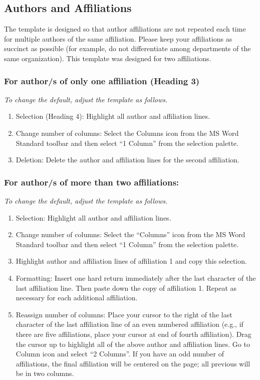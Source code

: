 \documentclass[conference, letter]{IEEEtran}
\begin{document}
\subsection{Authors and Affiliations}

The template is designed so that author affiliations are not repeated each time for multiple authors of the same affiliation. Please keep your affiliations as succinct as possible (for example, do not differentiate among departments of the same organization). This template was designed for two affiliations.

\subsubsection{For author/s of only one affiliation (Heading 3)} \textit{To change the default, adjust the template as follows.}

\begin{enumerate}[label=\alph*)]
    \item  Selection (Heading 4): Highlight all author and affiliation lines.
    \item Change number of columns: Select the Columns icon from the MS Word Standard toolbar and then select “1 Column” from the selection palette.
    \item Deletion: Delete the author and affiliation lines for the second affiliation.
\end{enumerate} 
\subsubsection{For author/s of more than two affiliations:} \textit{To change the default, adjust the template as follows.}
\begin{enumerate}[label=\alph*)]
    \item Selection: Highlight all author and affiliation lines.
    \item Change number of columns: Select the “Columns” icon from the MS Word Standard toolbar and then select “1 Column” from the selection palette.
    \item Highlight author and affiliation lines of affiliation 1 and copy this selection.
    \item  Formatting: Insert one hard return immediately after the last character of the last affiliation line. Then paste down the copy of affiliation 1. Repeat as necessary for each additional affiliation.
    \item Reassign number of columns: Place your cursor to the right of the last character of the last affiliation line of an even numbered affiliation (e.g., if there are five affiliations, place your cursor at end of fourth affiliation). Drag the cursor up to highlight all of the above author and affiliation lines. Go to Column icon and select “2 Columns”. If you have an odd number of affiliations, the final affiliation will be centered on the page; all previous will be in two columns.
\end{enumerate} 
\end{document}
